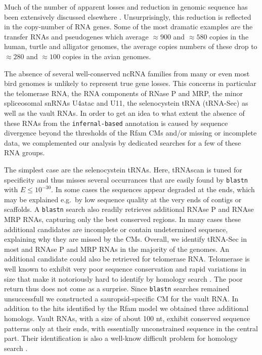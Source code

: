 \documentclass[10pt]{bmc_article}
\newenvironment{bmcformat}{\begin{raggedright}\baselineskip20pt\sloppy\setboolean{publ}{false}}{\end{raggedright}\baselineskip20pt\sloppy}
\begin{document}
\begin{bmcformat}
Much of the number of apparent losses and reduction in genomic
sequence has been extensively discussed elsewhere
\cite{Organ:2007}. Unsurprisingly, this reduction is reflected in the
copy-number of RNA genes. Some of the most dramatic examples are the
transfer RNAs and pseudogenes which average $\approx 900$ and $\approx
580$ copies in the human, turtle and alligator genomes, the average
copies numbers of these drop to $\approx 280$ and $\approx 100$ copies
in the avian genomes. 

The absence of several well-conserved ncRNA families from many or even most
bird genomes is unlikely to represent true gene losses. This concerns in
particular the telomerase RNA, the RNA components of RNase P and MRP, the
minor spliceosomal snRNAs U4atac and U11, the selenocystein tRNA (tRNA-Sec)
as well as the vault RNAs. In order to get an idea to what extent the
absence of these RNAs from the \texttt{infernal-based} annotation is caused 
by sequence divergence beyond the thresholds of the Rfam CMs and/or 
missing or incomplete data, we complemented our analysis by dedicated
searches for a few of these RNA groups. 

The simplest case are the selenocystein tRNAs. Here, tRNAscan is tuned for
specificity and thus misses several occurrances that are easily found by
\texttt{blastn} with $E\le 10^{-30}$. In some cases the sequences appear
degraded at the ends, which may be explained e.g.\ by low sequence quality
at the very ends of contigs or scaffolds. A \texttt{blastn} search also
readily retrieves additional RNAse P and RNAse MRP RNAs, capturing only the
best conserved regions. In many cases these additional candidates are
incomplete or contain undetermined sequence, explaining why they are missed
by the CMs. Overall, we identify tRNA-Sec in most and RNAse P and MRP RNAs
in the majority of the genomes. An additional candidate could also be
retrieved for telomerase RNA. Telomerase is well known to exhibit very poor
sequence conservation and rapid variations in size that make it notoriously
hard to identify by homology search \cite{Xie:08a}. The poor return thus
does not come as a surprise. Since \texttt{blastn} searches remained
unsuccessfull we constructed a sauropsid-specific CM for the vault RNA. In
addition to the hits identified by the Rfam model we obtained three
additional homologs. Vault RNAs, with a size of about 100 nt, exhibit
conserved sequence patterns only at their ends, with essentially
unconstrained sequence in the central part. Their identification is also a
well-know difficult problem for homology search
\cite{Stadler:09b}. 


\end{bmcformat}
\end{document}
